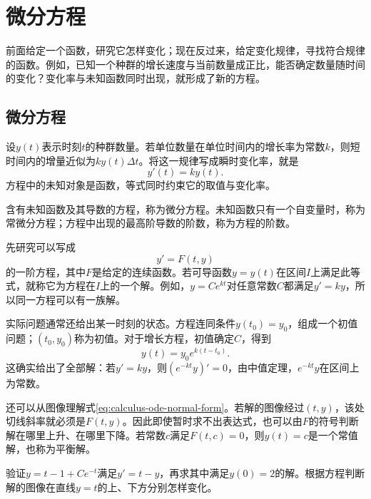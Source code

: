\FloatBarrier
\newpage
\section{微分方程}
\label{sec:calculus-differential-equations}

前面给定一个函数，研究它怎样变化；现在反过来，给定变化规律，寻找符合规律的函数。例如，已知一个种群的增长速度与当前数量成正比，能否确定数量随时间的变化？变化率与未知函数同时出现，就形成了新的方程。

\subsection{微分方程}

设\(y(t)\)表示时刻\(t\)的种群数量。若单位数量在单位时间内的增长率为常数\(k\)，则短时间内的增量近似为\(ky(t)\Delta t\)。将这一规律写成瞬时变化率，就是
\begin{equation*}
 y'(t)=ky(t).
\end{equation*}
方程中的未知对象是函数，等式同时约束它的取值与变化率。

\begin{definition}
含有未知函数及其导数的方程，称为{\heiti{}微分方程}。未知函数只有一个自变量时，称为{\heiti{}常微分方程}；方程中出现的最高阶导数的阶数，称为方程的{\heiti{}阶数}。
\end{definition}

先研究可以写成
\begin{equation}\label{eq:calculus-ode-normal-form}
 y'=F(t,y)
\end{equation}
的一阶方程，其中\(F\)是给定的连续函数。若可导函数\(y=y(t)\)在区间\(I\)上满足此等式，就称它为方程在\(I\)上的一个{\heiti{}解}。例如，\(y=Ce^{kt}\)对任意常数\(C\)都满足\(y'=ky\)，所以同一方程可以有一族解。

实际问题通常还给出某一时刻的状态。方程连同条件\(y(t_0)=y_0\)，组成一个{\heiti{}初值问题}；\((t_0,y_0)\)称为初值。对于增长方程，初值确定\(C\)，得到
\begin{equation*}
 y(t)=y_0e^{k(t-t_0)}.
\end{equation*}
这确实给出了全部解：若\(y'=ky\)，则\((e^{-kt}y)'=0\)，由中值定理，\(e^{-kt}y\)在区间上为常数。

还可以从图像理解式\eqref{eq:calculus-ode-normal-form}。若解的图像经过\((t,y)\)，该处切线斜率就必须是\(F(t,y)\)。因此即使暂时求不出表达式，也可以由\(F\)的符号判断解在哪里上升、在哪里下降。若常数\(c\)满足\(F(t,c)=0\)，则\(y(t)=c\)是一个常值解，也称为{\heiti{}平衡解}。

\begin{example}
验证\(y=t-1+Ce^{-t}\)满足\(y'=t-y\)，再求其中满足\(y(0)=2\)的解。根据方程判断解的图像在直线\(y=t\)的上、下方分别怎样变化。
\end{example}


